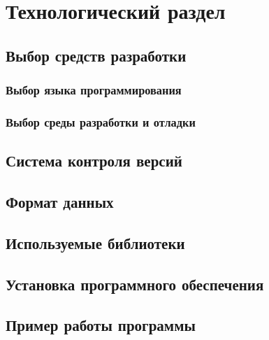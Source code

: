 \chapter{Технологический раздел}
\section{Выбор средств разработки}
\subsection{Выбор языка программирования}
\subsection{Выбор среды разработки и отладки}
\section{Система контроля версий}
\section{Формат данных}
\section{Используемые библиотеки}
\section{Установка программного обеспечения}
\section{Пример работы программы}